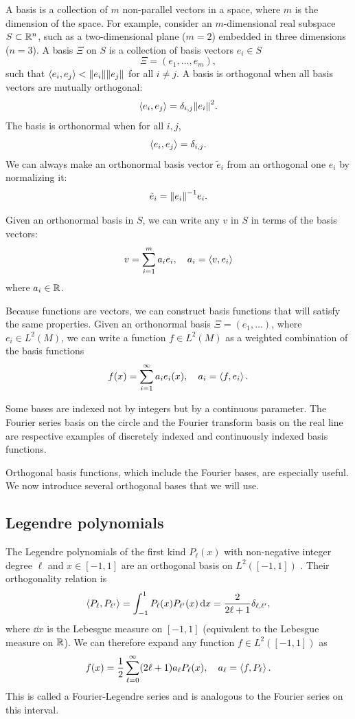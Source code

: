 \documentclass[../../main.tex]{subfiles}
\begin{document}
\begin{refsection}
	A basis is a collection of $m$ non-parallel vectors in a space, where $m$ is the dimension of the space.
	For example, consider an $m$-dimensional real subspace $S \subset \mathbb{R}^n$, such as a two-dimensional plane ($m=2$) embedded in three dimensions ($n=3$).
	A basis $\Xi$ on $S$ is a collection of basis vectors $e_i \in S$
	$$\Xi = (e_1, \ldots, e_m),$$
	such that $\left\langle e_i, e_j \right\rangle < \norm{e_i} \norm{e_j}$ for all $i \ne j$.
	A basis is orthogonal when all basis vectors are mutually orthogonal:
	$$\left\langle e_i, e_j \right\rangle = \delta_{i,j} \norm{e_i}^2.$$
	The basis is orthonormal when for all $i,j$,
	$$\left\langle e_i, e_j \right\rangle = \delta_{i,j}.$$
	We can always make an orthonormal basis vector $\tilde{e}_i$ from an orthogonal one $e_i$ by normalizing it:
	$$\tilde{e}_i = \norm{e_i}^{-1} e_i.$$

	Given an orthonormal basis in $S$, we can write any $v$ in $S$ in terms of the basis vectors:
	$$v = \sum_{i=1}^m a_i e_i, \quad a_i = \left\langle v, e_i \right\rangle$$
	where $a_i \in \mathbb{R}$.

	Because functions are vectors, we can construct basis functions that will satisfy the same properties.
	Given an orthonormal basis $\Xi = (e_1, \ldots)$, where $e_i \in L^2(M)$, we can write a function $f \in L^2(M)$ as a weighted combination of the basis functions
	$$f(x) = \sum_{i=1}^\infty a_i e_i(x), \quad a_i = \left\langle f, e_i \right\rangle.$$

	Some bases are indexed not by integers but by a continuous parameter.
	The Fourier series basis on the circle and the Fourier transform basis on the real line are respective examples of discretely indexed and continuously indexed basis functions.

	Orthogonal basis functions, which include the Fourier bases, are especially useful.
	We now introduce several orthogonal bases that we will use.

	\subsection{Legendre polynomials}

	The Legendre polynomials of the first kind $P_\ell(x)$ with non-negative integer degree $\ell$ and $x \in [-1, 1]$ are an orthogonal basis on $L^2([-1, 1])$ \cite[Section 18.3]{NIST:DLMF}.
	Their orthogonality relation is
	\begin{equation}\label{legendre_orthog}
		\left\langle P_\ell, P_{\ell'} \right\rangle = \int_{-1}^1 P_{\ell}(x) P_{\ell'}(x) \dd{x} = \frac{2}{2\ell + 1} \delta_{\ell,\ell'},
	\end{equation}
	where $\dd{x}$ is the Lebesgue measure on $[-1, 1]$ (\ie equivalent to the Lebesgue measure on $\mathbb{R}$).
	We can therefore expand any function $f \in L^2([-1, 1])$ as
	$$f(x) = \frac{1}{2}\sum_{\ell=0}^\infty (2\ell+1) a_\ell P_\ell(x), \quad a_\ell = \left\langle f, P_\ell \right\rangle.$$
	This is called a Fourier-Legendre series and is analogous to the Fourier series on this interval.


\end{refsection}
\end{document}
